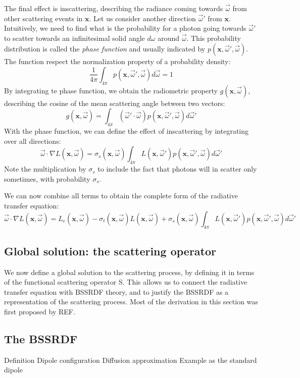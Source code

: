 The final effect is inscattering, describing the radiance coming towards $\vec{\omega}$ from other scattering events in $\mathbf{x}$. Let us consider another direction $\vec{\omega}'$ from $\mathbf{x}$. Intuitively, we need to find what is the probability for a photon going towards $\vec{\omega}'$ to scatter towards an infinitesimal solid angle $d{\omega}$ around $\vec{\omega}$. This probability distribution is called the \emph{phase function} and usually indicated by $p(\mathbf{x}, \vec{\omega}', \vec{\omega})$. The function respect the normalization property of a probability density:
$$\frac{1}{4\pi}\int_{4\pi} p(\mathbf{x}, \vec{\omega}', \vec{\omega}) d\vec{\omega} = 1$$
By integrating te phase function, we obtain the radiometric property $g(\mathbf{x}, \vec{\omega})$, describing the cosine of the mean scattering angle between two vectors:
$$g(\mathbf{x}, \vec{\omega}) = \int_{4\pi} (\vec{\omega}' \cdot \vec{\omega}) p(\mathbf{x}, \vec{\omega}', \vec{\omega}) d\vec{\omega}'$$
With the phase function, we can define the effect of inscattering by integrating over all directions:
$$\vec{\omega} \cdot \nabla L(\mathbf{x}, \vec{\omega}) = \sigma_s(\mathbf{x}, \vec{\omega}) \int_{4\pi} L(\mathbf{x}, \vec{\omega}')  p(\mathbf{x}, \vec{\omega}', \vec{\omega}) d \vec{\omega}'$$
Note the multiplication by $\sigma_s$ to include the fact that photons will in scatter only sometimes, with probability $\sigma_s$. 

We can now combine all terms to obtain the complete form of the radiative transfer equation:
$$\vec{\omega} \cdot \nabla L(\mathbf{x}, \vec{\omega}) = L_e(\mathbf{x}, \vec{\omega}) - \sigma_t(\mathbf{x}, \vec{\omega}) L(\mathbf{x}, \vec{\omega}) + \sigma_s(\mathbf{x}, \vec{\omega}) \int_{4\pi} L(\mathbf{x}, \vec{\omega}')  p(\mathbf{x}, \vec{\omega}', \vec{\omega}) d \vec{\omega}'$$

\subsection{Global solution: the scattering operator}
We now define a global solution to the scattering process, by defining it in terms of the functional scattering operator S. This allows us to connect the radiative transfer equation with BSSRDF theory, and to justify the BSSRDF as a representation of the scattering process. Most of the derivation in this section was first proposed by REF.



\subsection{The BSSRDF}
Definition
Dipole configuration
Diffusion approximation
Example as the standard dipole

